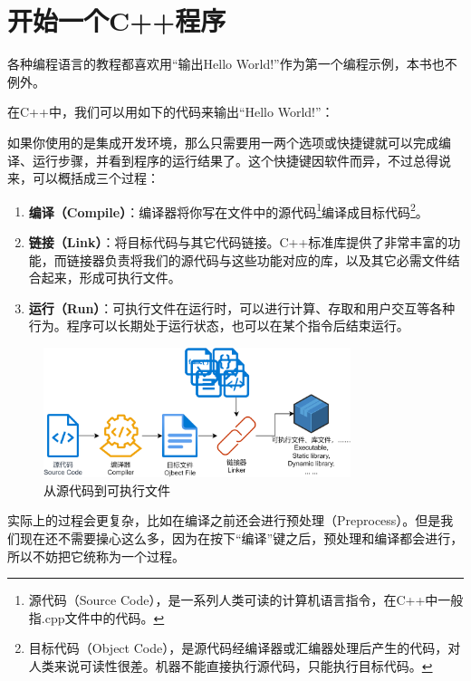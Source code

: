 \section{开始一个C++程序}
各种编程语言的教程都喜欢用``输出Hello World!''作为第一个编程示例，本书也不例外。\par
在C++中，我们可以用如下的代码来输出``Hello World!''：
\par
如果你使用的是集成开发环境，那么只需要用一两个选项或快捷键就可以完成编译、运行步骤，并看到程序的运行结果了。这个快捷键因软件而异，不过总得说来，可以概括成三个过程：
\begin{enumerate}
    \item \textbf{编译（Compile）}：编译器将你写在文件中的源代码\footnote{源代码（Source Code），是一系列人类可读的计算机语言指令，在C++中一般指.cpp文件中的代码。}编译成目标代码\footnote{目标代码（Object Code），是源代码经编译器或汇编器处理后产生的代码，对人类来说可读性很差。机器不能直接执行源代码，只能执行目标代码。}。
    \item \textbf{链接（Link）}：将目标代码与其它代码链接。C++标准库提供了非常丰富的功能，而链接器负责将我们的源代码与这些功能对应的库，以及其它必需文件结合起来，形成可执行文件。
    \item \textbf{运行（Run）}：可执行文件在运行时，可以进行计算、存取和用户交互等各种行为。程序可以长期处于运行状态，也可以在某个指令后结束运行。
\end{enumerate}
\begin{figure}[htbp]
    \centering
    \includegraphics[width=0.8\textwidth]{../images/generalized_parts/01_From_source_code_to_executable.drawio.png}
    \caption{从源代码到可执行文件}
\end{figure}
实际上的过程会更复杂，比如在编译之前还会进行预处理（Preprocess）。但是我们现在还不需要操心这么多，因为在按下``编译''键之后，预处理和编译都会进行，所以不妨把它统称为一个过程。\par
